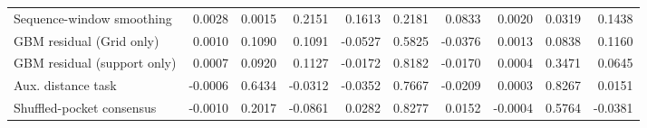 \begin{table}[t]
\begin{tabular}{lrrrrrrrrr}
Sequence-window smoothing & 0.0028 & 0.0015 & 0.2151 & 0.1613 & 0.2181 & 0.0833 & 0.0020 & 0.0319 & 0.1438 \\
GBM residual (Grid only) & 0.0010 & 0.1090 & 0.1091 & -0.0527 & 0.5825 & -0.0376 & 0.0013 & 0.0838 & 0.1160 \\
GBM residual (support only) & 0.0007 & 0.0920 & 0.1127 & -0.0172 & 0.8182 & -0.0170 & 0.0004 & 0.3471 & 0.0645 \\
Aux. distance task & -0.0006 & 0.6434 & -0.0312 & -0.0352 & 0.7667 & -0.0209 & 0.0003 & 0.8267 & 0.0151 \\
Shuffled-pocket consensus & -0.0010 & 0.2017 & -0.0861 & 0.0282 & 0.8277 & 0.0152 & -0.0004 & 0.5764 & -0.0381 \\
\bottomrule
\end{tabular}
\end{table}
